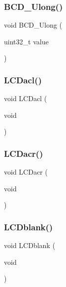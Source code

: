 \mbox{\label{lcd_8c_a2a94ac620ddde4753e24822d6841a851}} 
\subsubsection{B\+C\+D\+\_\+\+Ulong()}
{\footnotesize\ttfamily void B\+C\+D\+\_\+\+Ulong (\begin{DoxyParamCaption}\item[{uint32\+\_\+t}]{value }\end{DoxyParamCaption})}

\mbox{\label{lcd_8c_ab6928d673710c2a0c303f7bfc9bd4063}} 
\subsubsection{L\+C\+Dacl()}
{\footnotesize\ttfamily void L\+C\+Dacl (\begin{DoxyParamCaption}\item[{void}]{ }\end{DoxyParamCaption})}

\mbox{\label{lcd_8c_af8aaaaafb14508ca30208b125db7c7ca}} 
\subsubsection{L\+C\+Dacr()}
{\footnotesize\ttfamily void L\+C\+Dacr (\begin{DoxyParamCaption}\item[{void}]{ }\end{DoxyParamCaption})}

\mbox{\label{lcd_8c_afd9beebeb1deace8cc626fa140e01e29}} 
\subsubsection{L\+C\+Dblank()}
{\footnotesize\ttfamily void L\+C\+Dblank (\begin{DoxyParamCaption}\item[{void}]{ }\end{DoxyParamCaption})}

\mbox{\label{lcd_8c_a28e765a7041cb850f82f1e7b36ef4898}} 
